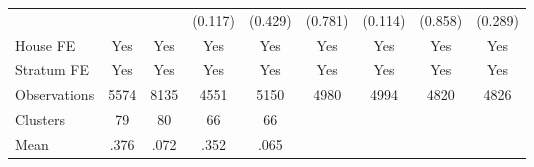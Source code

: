 {\begin{tabular}{l*{8}{c}}
                &                  &                  &  (0.117)         &  (0.429)         &  (0.781)         &  (0.114)         &  (0.858)         &  (0.289)         \\
House FE        &      Yes         &      Yes         &      Yes         &      Yes         &      Yes         &      Yes         &      Yes         &      Yes         \\
Stratum FE      &      Yes         &      Yes         &      Yes         &      Yes         &      Yes         &      Yes         &      Yes         &      Yes         \\
\midrule
Observations    &     5574         &     8135         &     4551         &     5150         &     4980         &     4994         &     4820         &     4826         \\
Clusters        &       79         &       80         &       66         &       66         &                  &                  &                  &                  \\
Mean            &     .376         &     .072         &     .352         &     .065         &                  &                  &                  &                  \\
\bottomrule
\end{tabular}
}
